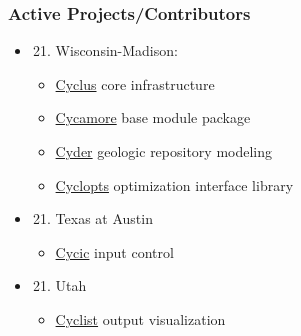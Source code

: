 \documentclass[letterpaper,10pt,english]{sphinxmanual}
\begin{document}
\subsubsection{Active Projects/Contributors}
\label{basics/roadmap:active-projects-contributors}\begin{itemize}
\item {} \begin{enumerate}
\setcounter{enumi}{20}
\item {} 
Wisconsin-Madison:

\end{enumerate}
\begin{itemize}
\item {} 
\href{http://github.com/cyclus/cyclus}{Cyclus} core infrastructure

\item {} 
\href{http://github.com/cyclus/cycamore}{Cycamore} base module package

\item {} 
\href{http://github.com/katyhuff/cyder}{Cyder} geologic repository modeling

\item {} 
\href{http://github.com/cyclus/cyclopts}{Cyclopts} optimization interface library

\end{itemize}

\item {} \begin{enumerate}
\setcounter{enumi}{20}
\item {} 
Texas at Austin

\end{enumerate}
\begin{itemize}
\item {} 
\href{http://github.com/cyclus/cycic}{Cycic} input control

\end{itemize}

\item {} \begin{enumerate}
\setcounter{enumi}{20}
\item {} 
Utah

\end{enumerate}
\begin{itemize}
\item {} 
\href{http://github.com/cyclus/cyclist}{Cyclist} output visualization

\end{itemize}

\end{itemize}
\end{document}
